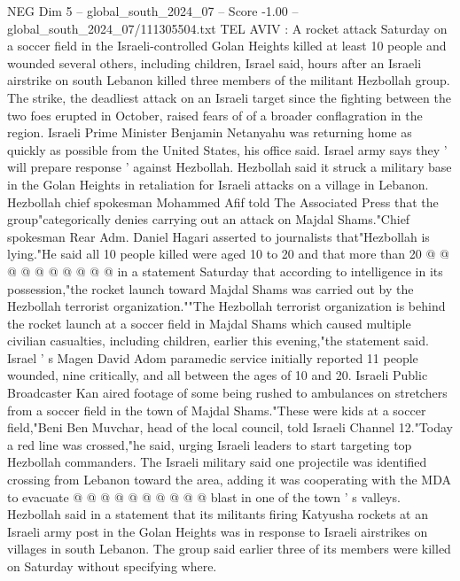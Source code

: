 \begin{textsample}{NEG Dim 5 – global\_south\_2024\_07 – Score -1.00 – global\_south\_2024\_07/111305504.txt}  \label{ex:f5_neg_292}
TEL AVIV : A rocket attack Saturday on a soccer field in the Israeli-controlled Golan Heights killed at least 10 people and wounded several others, including children, Israel said, hours after an Israeli airstrike on south Lebanon killed three members of the militant Hezbollah group.
The strike, the deadliest attack on an Israeli target since the fighting between the two foes erupted in October, raised fears of of a broader conflagration in the region.
Israeli Prime Minister Benjamin Netanyahu was returning home as quickly as possible from the United States, his office said.
Israel army says they ' will prepare response ' against Hezbollah.
Hezbollah said it struck a military base in the Golan Heights in retaliation for Israeli attacks on a village in Lebanon.
Hezbollah chief spokesman Mohammed Afif told The Associated Press that the group"categorically denies carrying out an attack on Majdal Shams."Chief spokesman Rear Adm.
Daniel Hagari asserted to journalists that"Hezbollah is lying."He said all 10 people killed were aged 10 to 20 and that more than 20 @ @ @ @ @ @ @ @ @ @ in a statement Saturday that according to intelligence in its possession,"the rocket launch toward Majdal Shams was carried out by the Hezbollah terrorist organization.""The Hezbollah terrorist organization is behind the rocket launch at a soccer field in Majdal Shams which caused multiple civilian casualties, including children, earlier this evening,"the statement said.
Israel ' s Magen David Adom paramedic service initially reported 11 people wounded, nine critically, and all between the ages of 10 and 20.
Israeli Public Broadcaster Kan aired footage of some being rushed to ambulances on stretchers from a soccer field in the town of Majdal Shams."These were kids at a soccer field,"Beni Ben Muvchar, head of the local council, told Israeli Channel 12."Today a red line was crossed,"he said, urging Israeli leaders to start targeting top Hezbollah commanders.
The Israeli military said one projectile was identified crossing from Lebanon toward the area, adding it was cooperating with the MDA to evacuate @ @ @ @ @ @ @ @ @ @ blast in one of the town ' s valleys.
Hezbollah said in a statement that its militants firing Katyusha rockets at an Israeli army post in the Golan Heights was in response to Israeli airstrikes on villages in south Lebanon.
The group said earlier three of its members were killed on Saturday without specifying where.

\end{textsample}
